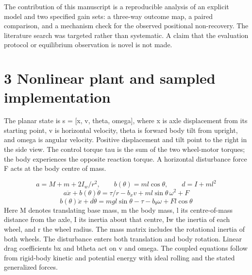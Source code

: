 \documentclass[11pt,a4paper]{article}
\begin{document}
The contribution of this manuscript is a reproducible analysis of an explicit model and two specified gain sets: a three-way outcome map, a paired comparison, and a mechanism check for the observed positional non-recovery. The literature search was targeted rather than systematic. A claim that the evaluation protocol or equilibrium observation is novel is not made.

\section*{3 Nonlinear plant and sampled implementation}
The planar state is s = [x, v, theta, omega], where x is axle displacement from its starting point, v is horizontal velocity, theta is forward body tilt from upright, and omega is angular velocity. Positive displacement and tilt point to the right in the side view. The control torque tau is the sum of the two wheel-motor torques; the body experiences the opposite reaction torque. A horizontal disturbance force F acts at the body centre of mass.

\begin{equation}a=M+m+2I_w/r^2,\qquad b(\theta)=ml\cos\theta,\qquad d=I+ml^2\end{equation}
\begin{equation}a\ddot{x}+b(\theta)\ddot{\theta}=\tau/r-b_xv+ml\sin\theta\,\omega^2+F\end{equation}
\begin{equation}b(\theta)\ddot{x}+d\ddot{\theta}=mgl\sin\theta-\tau-b_\theta\omega+Fl\cos\theta\end{equation}
Here M denotes translating base mass, m the body mass, l its centre-of-mass distance from the axle, I its inertia about that centre, Iw the inertia of each wheel, and r the wheel radius. The mass matrix includes the rotational inertia of both wheels. The disturbance enters both translation and body rotation. Linear drag coefficients bx and btheta act on v and omega. The coupled equations follow from rigid-body kinetic and potential energy with ideal rolling and the stated generalized forces.
\end{document}
